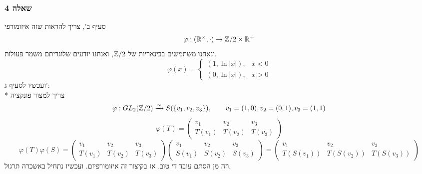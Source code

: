 \subsubsection{שאלה 4}
סעיף ב', צריך להראות שזה איזומורפי
\[
	\varphi : (\mathbb{R}^\times, \cdot) \to \mathbb{Z}/2 \times \mathbb{R}^+
\]
ונאחנו משתמשים בבינאריות של $\mathbb{Z}/2$, ואנחנו יודעים שלוגריתם משמר פעולות.
\[
	\varphi(x) = \begin{cases}
		(1, \ln|x|), & x < 0 \\
		(0, \ln|x|), & x > 0
	\end{cases}
\]
ועכשיו לסעיף ג': \\*
צריך למצור פונקציה
\[
	\varphi : GL_2(\mathbb{Z}/2) \xrightarrow{\sim} S(\{v_1, v_2, v_3\}), \qquad v_1 = (1, 0), v_2 = (0, 1), v_3 = (1, 1)
\]
\[
	\varphi(T) = \begin{pmatrix}
		v_1 & v_2 & v_3 \\
		T(v_1) & T(v_2) & T(v_3)
	\end{pmatrix}
\]
\[
	\varphi(T) \varphi(S) =
	\begin{pmatrix}
		v_1 & v_2 & v_3 \\
		T(v_1) & T(v_2) & T(v_3)
	\end{pmatrix}
	\begin{pmatrix}
		v_1 & v_2 & v_3 \\
		S(v_1) & S(v_2) & S(v_3)
	\end{pmatrix}
	=
	\begin{pmatrix}
		v_1 & v_2 & v_3 \\
		T(S(v_1)) & T(S(v_2)) & T(S(v_3))
	\end{pmatrix}
\]
וזה מן הסתם עובד די טוב. אז בקיצור זה איזומורפיזם. ועכשיו נתחיל באשכרה תרגול.

